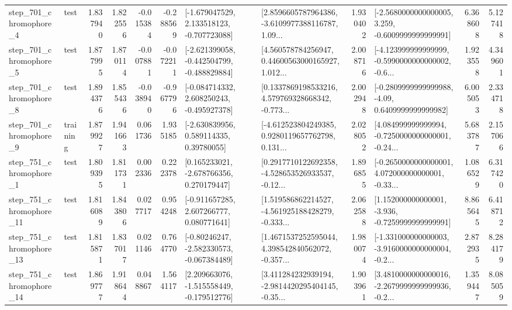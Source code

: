 \begin{tabular}{llrrrrllrlrr}
   step\_701\_chromophore\_4 &      test &      1.837940 &    1.822556 &     -0.015384 & -0.288569 &   [-1.679047529, 2.133518123, -0.707723088] &  [2.8596605787964386, -3.6109977388116787, 1.09... &       1.930402 &  [-2.5680000000000005, 3.259, -0.6009999999999991] &            6.368608 &          5.127418 \\
   step\_701\_chromophore\_5 &      test &      1.877995 &    1.870114 &     -0.007881 & -0.072211 &  [-2.621399058, -0.442504799, -0.488829884] &  [4.560578784256947, 0.44600563000165927, 1.012... &       2.008716 &  [-4.123999999999999, -0.5990000000000002, -0.6... &            1.923558 &          4.349601 \\
   step\_701\_chromophore\_8 &      test &      1.894376 &    1.855436 &     -0.038940 & -0.967796 &   [-0.084714332, 2.608250243, -0.495927378] &  [0.1337869198533216, 4.579769328668342, -0.773... &       2.002948 &   [-0.2809999999999988, -4.09, 0.6409999999999982] &            6.005053 &          2.334718 \\
   step\_701\_chromophore\_9 &  training &      1.879927 &    1.941663 &      0.061736 &  1.935185 &     [-2.630839956, 0.589114335, 0.39780055] &  [-4.612523804249385, 0.9280119657762798, 0.131... &       2.028052 &  [4.084999999999994, -0.7250000000000001, -0.24... &            5.683787 &          2.157066 \\
   step\_751\_chromophore\_1 &      test &      1.809395 &    1.811731 &      0.002336 &  0.222378 &    [0.165233021, -2.678766356, 0.270179447] &  [0.2917710122692358, -4.528653526933537, -0.12... &       1.896855 &  [-0.2650000000000001, 4.072000000000001, -0.33... &            1.086529 &          6.317420 \\
  step\_751\_chromophore\_11 &      test &      1.816089 &    1.843806 &      0.027717 &  0.954248 &    [-0.911657285, 2.607266777, 0.080771641] &  [1.519586862214527, -4.561925188428279, -0.333... &       2.062588 &   [1.152000000000001, -3.936, -0.7259999999999991] &            8.865645 &          6.418712 \\
  step\_751\_chromophore\_13 &      test &      1.815871 &    1.837017 &      0.021146 &  0.764770 &   [-0.80246247, -2.582330573, -0.067384489] &  [1.4671537252595044, 4.398542840562072, -0.357... &       1.980074 &  [-1.331000000000003, -3.9160000000000004, -0.2... &            2.872935 &          8.284179 \\
  step\_751\_chromophore\_14 &      test &      1.869777 &    1.918644 &      0.048867 &  1.564117 &   [2.209663076, -1.515558449, -0.179512776] &  [3.411284232939194, -2.9814420295404145, -0.35... &       1.903961 &  [3.4810000000000016, -2.2679999999999936, -0.2... &            1.359447 &          8.085059 \\

\end{tabular}
